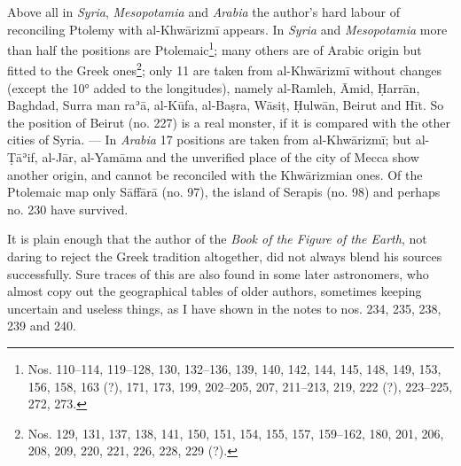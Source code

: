 \documentclass[11pt]{article}
\newcommand{\Pg}[1]{\marginpar{\footnotesize\color{gray}#1}}
\begin{document}
\par \Pg{II 213}Above all in \emph{Syria}, \emph{Mesopotamia} and \emph{Arabia} the author's hard labour of reconciling Ptolemy with al-Khwārizmī appears. In \emph{Syria} and \emph{Mesopotamia} more than half the positions are Ptolemaic\footnote{Nos. 110–114, 119–128, 130, 132–136, 139, 140, 142, 144, 145, 148, 149, 153, 156, 158, 163 (?), 171, 173, 199, 202–205, 207, 211–213, 219, 222 (?), 223–225, 272, 273.}; many others are of Arabic origin but fitted to the Greek ones\footnote{Nos. 129, 131, 137, 138, 141, 150, 151, 154, 155, 157, 159–162, 180, 201, 206, 208, 209, 220, 221, 226, 228, 229 (?).}; only 11 are taken from al-Khwārizmī without changes (except the 10° added to the longitudes), namely al-Ramleh, Āmid, Ḥarrān, Baghdad, Surra man raʾā, al-Kūfa, al-Baṣra, Wāsiṭ, Ḥulwān, Beirut and Hīt. So the position of Beirut (no. 227) is a real monster, if it is compared with the other cities of Syria. — In \emph{Arabia} 17 positions are taken from al-Khwārizmī; but al-Ṭāʾif, al-Jār, al-Yamāma and the unverified place of the city of Mecca show another origin, and cannot be reconciled with the Khwārizmian ones. Of the Ptolemaic map only Sāffārā (no. 97), the island of Serapis (no. 98) and perhaps no. 230 have survived.\par
\par It is plain enough that the author of the \emph{Book of the Figure of the Earth}, not daring to reject the Greek tradition altogether, did not always blend his sources successfully. Sure traces of this are also found in some later astronomers, who almost copy out the geographical tables of older authors, sometimes keeping uncertain and useless things, as I have shown in the notes to nos. 234, 235, 238, 239 and 240.\par
\end{document}
